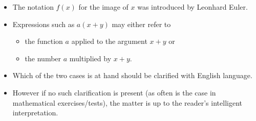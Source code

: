 \begin{frame}
\begin{itemize}
\item The notation $f(x)$ for the image of $x$ was introduced by Leonhard Euler.
\item<2-> Expressions such as $a(x+y)$ may either refer to
\begin{itemize}
\item<3-> the function $a$ applied to the argument $x+y$ or
\item<4-> the number $a$ multiplied by $x+y$.
\end{itemize}
\item<5-> Which of the two cases is at hand should be clarified with English language. 
\item<6-> However if no such clarification is present (as often is the case in mathematical exercises/tests), the matter is up to the reader's intelligent interpretation.
\end{itemize}
\end{frame}